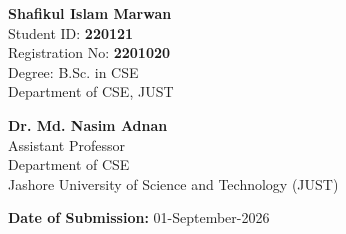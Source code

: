 \documentclass[11pt,a4paper]{article}
\begin{document}
\begin{titlepage}
\begin{center}
  \begin{minipage}[t]{0.47\textwidth}
    \begin{tcolorbox}[colback=lightbg,colframe=primaryblue,arc=2mm,title=\textbf{\footnotesize SUBMITTED BY},coltitle=white,left=3mm,right=3mm,top=2mm,bottom=2mm]
      \footnotesize
      \textbf{Shafikul Islam Marwan}\\
      Student ID: \textbf{220121}\\
      Registration No: \textbf{2201020}\\
      Degree: B.Sc. in CSE\\
      Department of CSE, JUST
    \end{tcolorbox}
  \end{minipage}
  \hfill
  \begin{minipage}[t]{0.47\textwidth}
    \begin{tcolorbox}[colback=lightbg,colframe=primaryblue,arc=2mm,title=\textbf{\footnotesize SUBMITTED TO},coltitle=white,left=3mm,right=3mm,top=2mm,bottom=2mm]
      \footnotesize
      \textbf{Dr. Md. Nasim Adnan}\\
      Assistant Professor\\
      Department of CSE\\
      Jashore University of Science and Technology (JUST)
    \end{tcolorbox}
  \end{minipage}

  \vspace{0.8cm}
  {\small \textbf{Date of Submission:} 01-September-2026}
  \vspace*{0.2cm}
\end{center}
\end{titlepage}

\clearpage
{}
\setcounter{page}{1}

\pagestyle{fancy}
\fancyhf{}
\fancyhead[L]{\small \textcolor{gray}{Software Development Project-II: Hotel Management System}}
\fancyhead[R]{\small \textcolor{gray}{Shafikul Islam Marwan (220121)}}
\fancyfoot[C]{\thepage}
\renewcommand{\headrulewidth}{0.4pt}
\renewcommand{\footrulewidth}{0.4pt}

\tableofcontents
\clearpage

\end{document}
